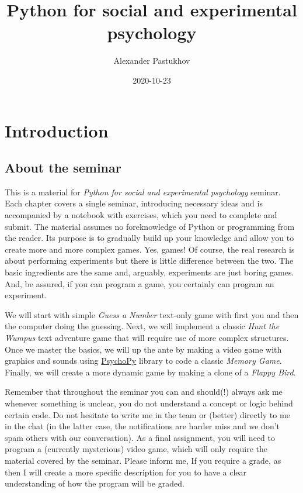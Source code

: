 \documentclass[
]{book}
\title{Python for social and experimental psychology}
\author{Alexander Pastukhov}
\date{2020-10-23}
\begin{document}
\maketitle

{
\setcounter{tocdepth}{1}
\tableofcontents
}
\hypertarget{introduction}{%
\chapter*{Introduction}\label{introduction}}

\hypertarget{about-the-seminar}{%
\section*{About the seminar}\label{about-the-seminar}}

This is a material for \emph{Python for social and experimental psychology} seminar. Each chapter covers a single seminar, introducing necessary ideas and is accompanied by a notebook with exercises, which you need to complete and submit. The material assumes no foreknowledge of Python or programming from the reader. Its purpose is to gradually build up your knowledge and allow you to create more and more complex games. Yes, games! Of course, the real research is about performing experiments but there is little difference between the two. The basic ingredients are the same and, arguably, experiments are just boring games. And, be assured, if you can program a game, you certainly can program an experiment.

We will start with simple \emph{Guess a Number} text-only game with first you and then the computer doing the guessing. Next, we will implement a classic \emph{Hunt the Wumpus} text adventure game that will require use of more complex structures. Once we master the basics, we will up the ante by making a video game with graphics and sounds using \href{https://psychopy.org/}{PsychoPy} library to code a classic \emph{Memory Game}. Finally, we will create a more dynamic game by making a clone of a \emph{Flappy Bird}.

Remember that throughout the seminar you can and should(!) always ask me whenever something is unclear, you do not understand a concept or logic behind certain code. Do not hesitate to write me in the team or (better) directly to me in the chat (in the latter case, the notifications are harder miss and we don't spam others with our conversation).
As a final assignment, you will need to program a (currently mysterious) video game, which will only require the material covered by the seminar. Please inform me, If you require a grade, as then I will create a more specific description for you to have a clear understanding of how the program will be graded.
\end{document}
